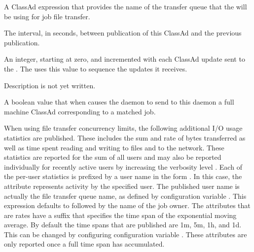 \begin{description}
\item[\AdAttr{TransferQueueUserExpr}]
  A ClassAd expression that provides the name of the transfer queue
  that the  will be using for job file transfer.

\item[\AdAttr{UpdateInterval}:] The interval, in seconds,
  between publication of this  ClassAd and
  the previous publication.

\item[\AdAttr{UpdateSequenceNumber}:] An integer, starting at zero,
  and incremented with each ClassAd update sent to the .
  The  uses this value to sequence the updates it
  receives.

\item[\AdAttr{VirtualMemory}:] Description is not yet written.

\item[\AdAttr{WantResAd}:] A boolean value that when 
  causes the  daemon to send to this 
  daemon a full machine ClassAd corresponding to a matched job.

\end{description}

\label{sec:FT-Scheduler-ClassAd-Attributes}
When using file transfer concurrency limits, 
the following additional I/O usage statistics are published.
These includes the sum and rate of bytes
transferred as well as time spent reading and writing to files and
to the network.  These statistics are reported for the sum of all
users and may also be reported individually for recently active users
by increasing the verbosity level .
Each of the per-user statistics is prefixed by a
user name in the form .
In this case, the attribute represents activity by the specified user.
The published user name is actually the file transfer queue name, 
as defined by configuration variable .
This expression defaults to  followed by the name of the job
owner.
The attributes that are rates have a
suffix that specifies the time span of the exponential moving average.
By default the time spans that are published are 1m, 5m, 1h, and 1d.
This can be changed by configuring configuration variable
.  These attributes are only
reported once a full time span has accumulated.

